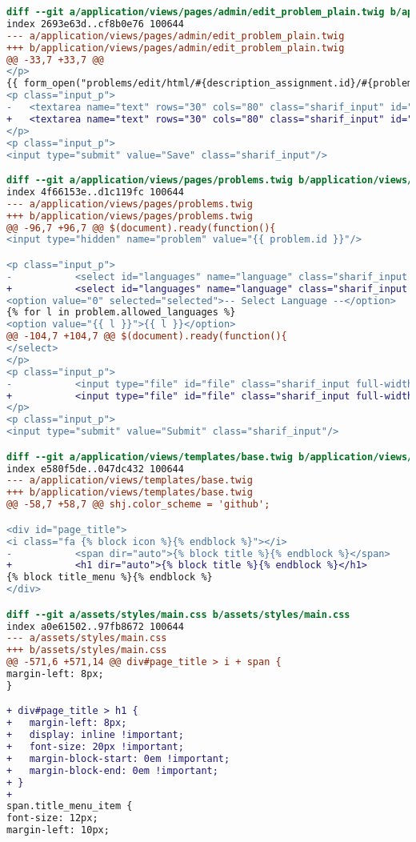 \begin{itemize}
\begin{lstlisting}[language=diff, caption=Perubahan untuk mematuhi kriteria 1.3.1, label=lst_1.3.1, basicstyle=\ttfamily, frame=single,
columns=fullflexible, keepspaces=true, breaklines=true]
diff --git a/application/views/pages/admin/edit_problem_plain.twig b/application/views/pages/admin/edit_problem_plain.twig
index 2693e63d..cf8b0e76 100644
--- a/application/views/pages/admin/edit_problem_plain.twig
+++ b/application/views/pages/admin/edit_problem_plain.twig
@@ -33,7 +33,7 @@
</p>
{{ form_open("problems/edit/html/#{description_assignment.id}/#{problem.id}") }}
<p class="input_p">
- 	<textarea name="text" rows="30" cols="80" class="sharif_input" id="html_editor">{{ problem.description }}</textarea>
+ 	<textarea name="text" rows="30" cols="80" class="sharif_input" id="html_editor" aria-label="HTML Editor">{{ problem.description }}</textarea>
</p>
<p class="input_p">
<input type="submit" value="Save" class="sharif_input"/>

diff --git a/application/views/pages/problems.twig b/application/views/pages/problems.twig
index 4f66153e..d1c119fc 100644
--- a/application/views/pages/problems.twig
+++ b/application/views/pages/problems.twig
@@ -96,7 +96,7 @@ $(document).ready(function(){
<input type="hidden" name="problem" value="{{ problem.id }}"/>

<p class="input_p">
- 			<select id="languages" name="language" class="sharif_input full-width">
+ 			<select id="languages" name="language" class="sharif_input full-width" aria-label="Select Language">
<option value="0" selected="selected">-- Select Language --</option>
{% for l in problem.allowed_languages %}
<option value="{{ l }}">{{ l }}</option>
@@ -104,7 +104,7 @@ $(document).ready(function(){
</select>
</p>
<p class="input_p">
- 			<input type="file" id="file" class="sharif_input full-width" name="userfile"/>
+ 			<input type="file" id="file" class="sharif_input full-width" name="userfile" aria-label="Upload File"/>
</p>
<p class="input_p">
<input type="submit" value="Submit" class="sharif_input"/>

diff --git a/application/views/templates/base.twig b/application/views/templates/base.twig
index e580f5de..047dc432 100644
--- a/application/views/templates/base.twig
+++ b/application/views/templates/base.twig
@@ -58,7 +58,7 @@ shj.color_scheme = 'github';

<div id="page_title">
<i class="fa {% block icon %}{% endblock %}"></i>
- 			<span dir="auto">{% block title %}{% endblock %}</span>
+ 			<h1 dir="auto">{% block title %}{% endblock %}</h1>
{% block title_menu %}{% endblock %}
</div>

diff --git a/assets/styles/main.css b/assets/styles/main.css
index a0e61502..97fb8672 100644
--- a/assets/styles/main.css
+++ b/assets/styles/main.css
@@ -571,6 +571,14 @@ div#page_title > i + span {
margin-left: 8px;
}

+ div#page_title > h1 {
+ 	margin-left: 8px;
+ 	display: inline !important;
+ 	font-size: 20px !important;
+ 	margin-block-start: 0em !important;
+ 	margin-block-end: 0em !important;
+ }
+ 
span.title_menu_item {
font-size: 12px;
margin-left: 10px;
\end{lstlisting}

\end{itemize}

